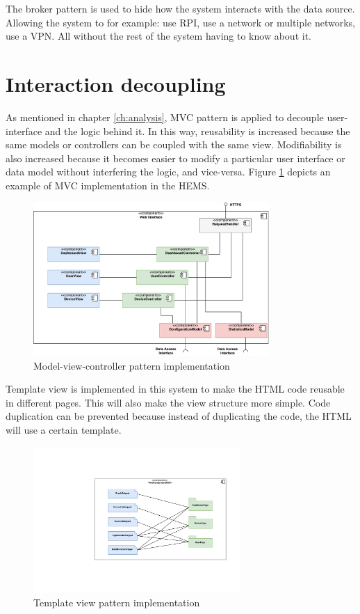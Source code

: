 The broker pattern is used to hide how the system interacts with the data source. Allowing the system to for example: use RPI, use a network or multiple networks, use a VPN. All without the rest of the system having to know about it.

\section{Interaction decoupling}
As mentioned in chapter \ref{ch:analysis}, MVC pattern is applied to decouple user-interface and the logic behind it. In this way, reusability is increased because the same models or controllers can be coupled with the same view. Modifiability is also increased because it becomes easier to modify a particular user interface or data model without interfering the logic, and vice-versa. Figure \ref{fig:mvc-architecture} depicts an example of MVC implementation in the HEMS.

\begin{figure}[H]
	\centering
	\includegraphics[width=0.8\textwidth]{7-software/images/mvc.pdf}
	\caption{Model-view-controller pattern implementation}
	\label{fig:mvc-architecture}
\end{figure}

\label{sec:template-view}
Template view is implemented in this system to make the HTML code reusable in different pages. This will also make the view structure more simple. Code duplication can be prevented because instead of duplicating the code, the HTML will use a certain template.

\begin{figure}[H]
	\centering
	\includegraphics[width=0.7\textwidth]{7-software/images/template-view.pdf}
	\caption{Template view pattern implementation}
	\label{fig:template-view-architecture}
\end{figure}

